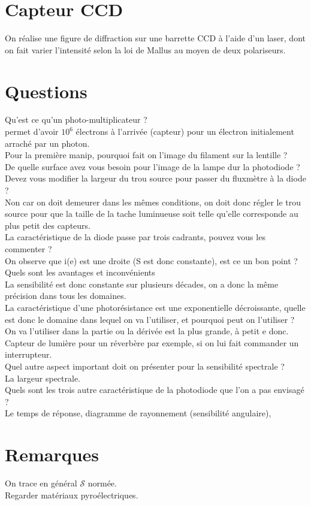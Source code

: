 \documentclass[12pt,prb,aps,epsf]{report}
\begin{document}
\section{Capteur CCD}

On réalise une figure de diffraction sur une barrette CCD à l'aide d'un laser, dont on fait varier l'intensité selon la loi de Mallus au moyen de deux polariseurs.


\section*{Questions}
Qu'est ce qu'un photo-multiplicateur ?\\
permet d'avoir $10^6$ électrons à l'arrivée (capteur) pour un électron initialement arraché par un photon.\\

Pour la première manip, pourquoi fait on l'image du filament sur la lentille ?\\

De quelle surface avez vous besoin pour l'image de la lampe dur la photodiode ?\\

Devez vous modifier la largeur du trou source pour passer du fluxmètre à la diode ?\\
Non car on doit demeurer dans les mêmes conditions, on doit donc régler le trou source pour que la taille de la tache luminueuse soit telle qu'elle corresponde au plus petit des capteurs.\\

La caractéristique de la diode passe par trois cadrants, pouvez vous les commenter ?\\

On observe que i(e) est une droite (S est donc constante), est ce un bon point ? Quels sont les avantages et inconvénients\\
La sensibilité est donc constante sur plusieurs décades, on a donc la même précision dans tous les domaines.\\

La caractéristique d'une photorésistance est une exponentielle décroissante, quelle est donc le domaine dans lequel on va l'utiliser, et pourquoi peut on l'utiliser ?\\
On va l'utiliser dans la partie ou la dérivée est la plus grande, à petit e donc. Capteur de lumière pour un réverbère par exemple, si on lui fait commander un interrupteur.\\

Quel autre aspect important doit on présenter pour la sensibilité spectrale ?\\
La largeur spectrale.\\

Quels sont les trois autre caractéristique de la photodiode que l'on a pas envisagé ?\\
Le temps de réponse, diagramme de rayonnement (sensibilité angulaire), 

\section*{Remarques}
On trace en général $\mathcal{S}$ normée.\\
Regarder matériaux pyroélectriques.
\end{document}
